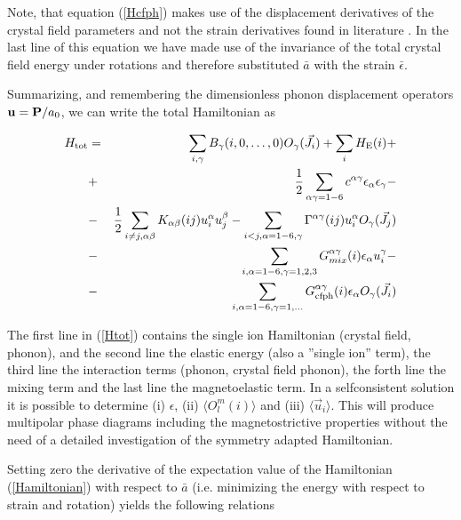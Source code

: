 Note, that equation (\ref{Hcfph}) makes use of the displacement derivatives of the 
crystal field parameters and not the strain derivatives found in literature
 \cite{palmer78-2465,jensen75-320,mcewen91-3298}.
In the last line of this equation we have made use of the invariance of the
total crystal field energy under rotations
and therefore substituted $\bar a$ with the strain $\bar \epsilon$.

Summarizing, and remembering the dimensionless phonon displacement operators
$\mathbf u = \mathbf P / a_0$, we can write the total Hamiltonian as

\begin{eqnarray}\label{Htot}
H_{\rm tot} & = & \sum_{i,\gamma} B_{\gamma}(i,0,\dots,0) O_{\gamma}(\vec J_i) + \sum_{i} H_{\rm E}(i) + \\
&+&\frac{1}{2}\sum_{\alpha\gamma=1-6} c^{\alpha\gamma} \epsilon_{\alpha}\epsilon_{\gamma} - \nonumber \\
&-&\frac{1}{2}\sum_{i\ne j,\alpha\beta} K_{\alpha\beta}(ij) u_{i}^{\alpha}u_{j}^{\beta} 
-\sum_{i<j,\alpha=1-6,\gamma}\Gamma^{\alpha\gamma}(ij) u^{\alpha}_i O_{\gamma}(\vec J_j)
\nonumber \\
&-&\sum_{i,\alpha=1-6,\gamma=1,2,3} G_{mix}^{\alpha\gamma}(i) \epsilon_{\alpha} u_{i}^{\gamma} - \nonumber \\
&-&\sum_{i,\alpha=1-6,\gamma=1,...} G_{\rm cfph}^{\alpha\gamma}(i) \epsilon_{\alpha} O_{\gamma}(\vec J_i) \nonumber
 \end{eqnarray}



The first line in (\ref{Htot}) contains the single ion Hamiltonian (crystal field, phonon), 
and the second line the elastic energy (also a ''single ion'' term),
the third line the interaction terms (phonon, crystal field phonon), 
the forth line the mixing term and 
the last line  the magnetoelastic term. 
In a selfconsistent solution it is possible to 
determine (i) $\epsilon$, (ii) $\langle O_l^m(i) \rangle $ and (iii)
$\langle \vec u_i \rangle$. This will produce multipolar phase diagrams including the
magnetostrictive properties without the need of a detailed investigation of the symmetry adapted Hamiltonian.

Setting zero the derivative of the expectation value of the Hamiltonian (\ref{Hamiltonian}) with respect to
 $\bar a$  (i.e. minimizing the energy with respect to strain and  rotation) 
yields the following relations 

